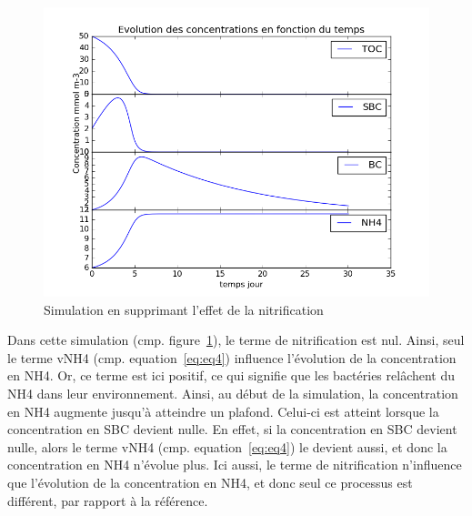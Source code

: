 \begin{figure}[h!]
  \includegraphics[width=\textwidth]{partie1/Test6.png}
  \caption{Simulation en supprimant l'effet de la nitrification
  }
  \label{fig:partie1test6}
\end{figure}

\par{
Dans cette simulation (cmp. figure~\ref{fig:partie1test6}), le terme de nitrification est nul. Ainsi, seul le terme vNH4 (cmp. equation~\ref{eq:eq4}) influence l'\'evolution de
la concentration en NH4. Or, ce terme est ici positif, ce qui signifie que les bact\'eries rel\^achent du NH4
dans leur environnement. Ainsi, au d\'ebut de la simulation, la concentration en NH4 augmente jusqu'\`a
atteindre un plafond. Celui-ci est atteint lorsque la concentration en SBC devient nulle. En effet, si la
concentration en SBC devient nulle, alors le terme vNH4 (cmp. equation~\ref{eq:eq4}) le devient aussi, et donc la concentration en NH4
n'\'evolue plus. Ici aussi, le terme de nitrification n'influence que l'\'evolution de la concentration en
NH4, et donc seul ce processus est diff\'erent, par rapport \`a la r\'ef\'erence.
}

\FloatBarrier
\newpage
